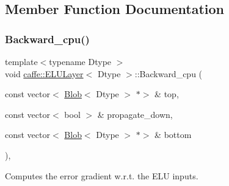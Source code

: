 \subsection{Member Function Documentation}
\mbox{\label{classcaffe_1_1_e_l_u_layer_a606284cd2e5ff40154ff0865a100b940}} 
\subsubsection{\texorpdfstring{Backward\+\_\+cpu()}{Backward\_cpu()}\hspace{0.1cm}{\footnotesize\ttfamily [1/2]}}
{\footnotesize\ttfamily template$<$typename Dtype $>$ \\
void \mbox{\hyperlink{classcaffe_1_1_e_l_u_layer}{caffe\+::\+E\+L\+U\+Layer}}$<$ Dtype $>$\+::Backward\+\_\+cpu (\begin{DoxyParamCaption}\item[{const vector$<$ \mbox{\hyperlink{classcaffe_1_1_blob}{Blob}}$<$ Dtype $>$ $\ast$$>$ \&}]{top,  }\item[{const vector$<$ bool $>$ \&}]{propagate\+\_\+down,  }\item[{const vector$<$ \mbox{\hyperlink{classcaffe_1_1_blob}{Blob}}$<$ Dtype $>$ $\ast$$>$ \&}]{bottom }\end{DoxyParamCaption})\hspace{0.3cm}{\ttfamily [protected]}, {\ttfamily [virtual]}}



Computes the error gradient w.\+r.\+t. the E\+LU inputs. 


